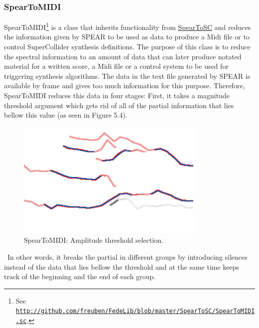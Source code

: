 \subsubsection{SpearToMIDI}
\hypertarget{spearmidi}{}

SpearToMIDI\footnote{See \href{http://github.com/freuben/FedeLib/blob/master/SpearToSC/SpearToMIDI.sc}{\texttt{http://github.com/freuben/FedeLib/blob/master/SpearToSC/SpearToMIDI.sc}}.} is a class that inherits functionality from \hyperlink{spearsc}{SpearToSC} and reduces the information given by SPEAR to be used as data to produce a Midi file or to control SuperCollider synthesis definitions. The purpose of this class is to reduce the spectral information to an amount of data that can later produce notated material for a written score, a Midi file or a control system to be used for triggering synthesis algorithms. The data in the text file generated by SPEAR is available by frame and gives too much information for this purpose. Therefore, SpearToMIDI reduces this data in four stages: First, it takes a magnitude threshold argument which gets rid of all of the partial information that lies bellow this value (as seen in Figure 5.4).
\begin{figure}[htbp] %
   \centering
   \includegraphics[width=9cm]{chapter5/Spear2.tif} %
   \caption{SpearToMIDI: Amplitude threshold selection.}
   \label{fig:example}
\end{figure}\
In other words, it breaks the partial in different groups by introducing silences instead of the data that lies bellow the threshold and at the same time keeps track of the beginning and the end of each group. 

